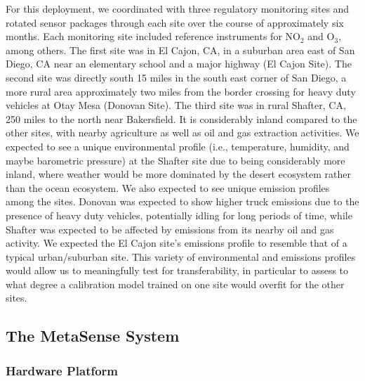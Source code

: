 \documentclass[journal abbreviation, manuscript]{copernicus}
\newcommand{\textus}[1]{$_{\text{#1}}$}
\begin{document}
For this deployment, we coordinated with three regulatory monitoring sites and rotated sensor packages through each site over the course of approximately six months. Each monitoring site included reference instruments for NO\textus{2} and O\textus{3}, among others. The first site was in El Cajon, CA, in a suburban area east of San Diego, CA near an elementary school and a major highway (El Cajon Site). The second site was directly south 15 miles in the south east corner of San Diego, a more rural area approximately two miles from the border crossing for heavy duty vehicles at Otay Mesa (Donovan Site). The third site was in rural Shafter, CA, 250 miles to the north near Bakersfield.  It is considerably inland compared to the other sites, with nearby agriculture as well as oil and gas extraction activities. We expected to see a unique environmental profile (i.e., temperature, humidity, and maybe barometric pressure) at the Shafter site due to being considerably more inland, where weather would be more dominated by the desert ecosystem rather than the ocean ecosystem.  We also expected to see unique emission profiles among the sites.  Donovan was expected to show higher truck emissions due to the presence of heavy duty vehicles, potentially idling for long periods of time, while Shafter was expected to be affected by emissions from its nearby oil and gas activity. We expected the El Cajon site's emissions profile to resemble that of a typical urban/suburban site.  This variety of environmental and emissions profiles would allow us to meaningfully test for transferability, in particular to assess to what degree a calibration model trained on one site would overfit for the other sites.

\subsection{The MetaSense System}

\subsubsection{Hardware Platform}
\end{document}
